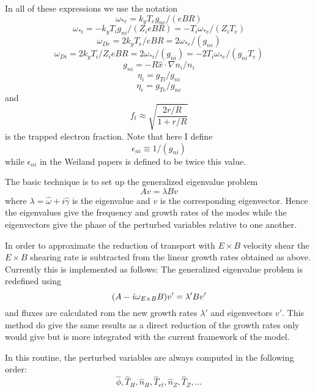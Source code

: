 In all of these expressions we use the notation
$$ \omega_{*e} = k_y T_e g_{ne} / ( e B R ) $$
$$ \omega_{*i} = - k_y T_i g_{ni} / ( Z_i e B R )
    = - T_i \omega_{*e} / ( Z_i T_e ) $$
$$ \omega_{De} = 2 k_y T_e / e B R = 2 \omega_{*e} / ( g_{ne} ) $$
$$ \omega_{Di} = 2 k_y T_i / Z_i e B R = 2 \omega_{*i} / ( g_{ni} )
   = - 2 T_i \omega_{*e} / (  g_{ni} T_e ) $$
$$ g_{ni} = - R \hat{x} \cdot \nabla n_i / n_i $$
$$ \eta_i = g_{Ti} / g_{ni}  $$
$$ \eta_e = g_{Te} / g_{ne} $$
and
$$ f_t \approx \sqrt{ \frac{ 2 r/R }{ 1 + r/R } } $$
is the trapped electron fraction.
Note that here I define 
\[ \epsilon_{ni} \equiv 1 / ( g_{ni} ) \]
while $ \epsilon_{ni} $ in the Weiland papers is defined to be
twice this value.

The basic technique is to set up the generalized eigenvalue problem
\[ A v = \lambda B v \]
where $ \lambda = \hat{\omega} + i \hat{\gamma} $ is the eigenvalue
and $ v $ is the corresponding eigenvector.
Hence the eigenvalues give the frequency and growth rates of the
modes while the eigenvectors give the phase of the perturbed
variables relative to one another.

In order to approximate the reduction of transport with $E\times B$ 
velocity shear the $E\times B $ shearing rate is subtracted from the 
linear growth rates obtained as above. Currently this is implemented as
follows: The generalized eigenvalue problem is redefined using  
 \[ (A - {\it i} \omega_{E\times B} B) v' = {\lambda}' B v' \]
and fluxes are calculated rom the new growth rates   ${\lambda}'$ 
and eigenvectors $v'$. This method do give the same results as a 
direct reduction of the growth rates only would give but is more 
integrated with the current framework of the model.

  
In this routine, the perturbed variables are always computed in
the following order:
\[ \hat{\phi}, \hat{T}_H, \hat{n}_H, \hat{T}_{et},
    \hat{n}_Z, \hat{T}_Z, \ldots \]

